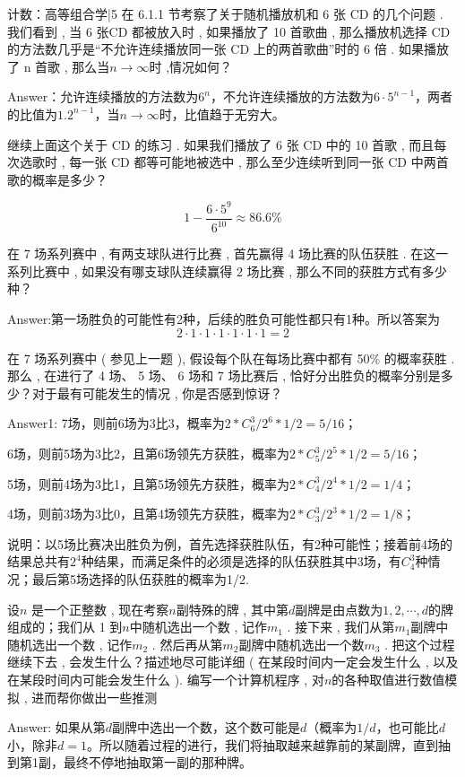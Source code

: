 \newChapter 计数\uppercase\expandafter{}：高等组合学|5
\exer 在 6.1.1 节考察了关于随机播放机和 6 张 CD 的几个问题 . 我们看到 , 当 6 张CD 都被放入时 , 如果播放了 10 首歌曲 , 那么播放机选择 CD 的方法数几乎是“不允许连续播放同一张 CD 上的两首歌曲”时的 6 倍 . 如果播放了 n 首歌 , 那么当$n\to\infty$时 ,情况如何？\par
Answer：允许连续播放的方法数为$6^n$，不允许连续播放的方法数为$6\cdot5^{n-1}$，两者的比值为$1.2^{n-1}$，当$n\to\infty$时，比值趋于无穷大。

\exer 继续上面这个关于 CD 的练习 . 如果我们播放了 6 张 CD 中的 10 首歌 , 而且每次选歌时 , 每一张 CD 都等可能地被选中 , 那么至少连续听到同一张 CD 中两首歌的概率是多少？\par
\[1-\frac{6\cdot5^9}{6^{10}}\approx 86.6\%\]

\exer 在 7 场系列赛中 , 有两支球队进行比赛 , 首先赢得 4 场比赛的队伍获胜 . 在这一系列比赛中 , 如果没有哪支球队连续赢得 2 场比赛 , 那么不同的获胜方式有多少种？\par
Answer:第一场胜负的可能性有2种，后续的胜负可能性都只有1种。所以答案为
\[2\cdot1\cdot1\cdot1\cdot1\cdot1\cdot1=2\]

\exer 在 7 场系列赛中 ( 参见上一题 ), 假设每个队在每场比赛中都有 50\% 的概率获胜 . 那么 , 在进行了 4 场、 5 场、 6 场和 7 场比赛后 , 恰好分出胜负的概率分别是多少？对于最有可能发生的情况 , 你是否感到惊讶？\par
Answer1: 7场，则前6场为3比3，概率为$2*C_6^3/2^6*1/2=5/16$；\par
6场，则前5场为3比2，且第6场领先方获胜，概率为$2*C_5^3/2^5*1/2=5/16$；\par
5场，则前4场为3比1，且第5场领先方获胜，概率为$2*C_4^3/2^4*1/2=1/4$；\par
4场，则前3场为3比0，且第4场领先方获胜，概率为$2*C_3^3/2^3*1/2=1/8$；\par
说明：以5场比赛决出胜负为例，首先选择获胜队伍，有2种可能性；接着前4场的结果总共有$2^4$种结果，而满足条件的必须是选择的队伍获胜其中3场，有$C_4^3$种情况；最后第5场选择的队伍获胜的概率为1/2.

\exer 设$n$ 是一个正整数 , 现在考察$n$副特殊的牌 , 其中第$d$副牌是由点数为$ 1,2,\cdots ,d$的牌组成的；我们从 1 到$n$中随机选出一个数 , 记作$m_1$ . 接下来 , 我们从第$m_1$副牌中随机选出一个数 , 记作$m_2$ . 然后再从第$m_2$副牌中随机选出一个数$m_3$ . 把这个过程继续下去 , 会发生什么？描述地尽可能详细 ( 在某段时间内一定会发生什么 , 以及在某段时间内可能会发生什么 ). 编写一个计算机程序 , 对$n$的各种取值进行数值模拟 , 进而帮你做出一些推测 \par
Answer: 如果从第$d$副牌中选出一个数，这个数可能是$d$（概率为$1/d$，也可能比$d$小，除非$d=1$。所以随着过程的进行，我们将抽取越来越靠前的某副牌，直到抽到第1副，最终不停地抽取第一副的那种牌。

